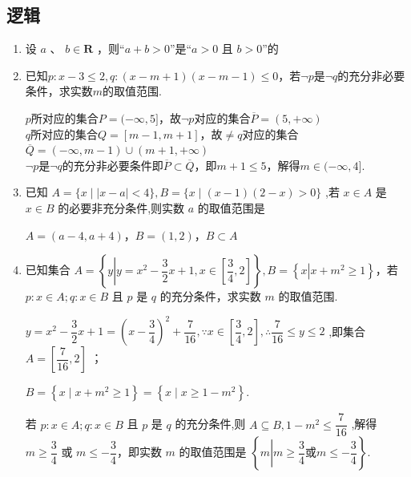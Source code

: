 \subsection*{逻辑}
\begin{enumerate}
    \item 设 $a$ 、 $b \in  \mathbf{R}$ ，则“$a + b > 0$”是“$a > 0$ 且 $b > 0$”的 
    \item 已知$p: x-3 \leq 2, q: (x-m+1)(x-m-1) \leq 0$，若$\neg p$是$\neg q$的充分非必要条件，求实数$m$的取值范围.
    \begin{jieda}
        $p$所对应的集合$P = (-\infty, 5]$，故$\neg p$对应的集合$\overline{P} = (5, +\infty)$ \\
        $q$所对应的集合$Q = [m-1, m+1]$，故$\neq q$对应的集合$\overline{Q} = (-\infty, m-1) \cup (m+1, +\infty)$ \\
        $\neg p$是$\neg q$的充分非必要条件即$\overline{P} \subset \overline{Q}$，即$m+1 \leq 5$，解得$m \in (-\infty, 4]$.
    \end{jieda}

    \item 已知 $A = \{ x \mid  \left| {x - a}\right|  < 4\} ,B = \{ x \mid  \left( {x - 1}\right) \left( {2 - x}\right)  > 0\}$ ,若 $x \in  A$ 是 $x \in  B$ 的必要非充分条件,则实数 $a$ 的取值范围是\blkda{$[-2, 5]$}
    \begin{jieda}
        $A = (a-4, a+4)$，$B = (1,2)$，$B \subset A$
    \end{jieda}
    
    \item 已知集合 $A = \left\{  {y\left| {y = {x}^{2} - \dfrac{3}{2}x + 1}\right. ,x \in  \left\lbrack  {\dfrac{3}{4},2}\right\rbrack  }\right\}  ,B = \left\{  {x\left| {x + {m}^{2} \geq  1}\right. }\right\}$，若 $p : x \in  A;q : x \in  B$ 且 $p$ 是 $q$ 的充分条件，求实数 $m$ 的取值范围.
    \begin{jieda}
        $y = {x}^{2} - \dfrac{3}{2}x + 1 = {\left( x - \dfrac{3}{4}\right) }^{2} + \dfrac{7}{16},\because x \in  \left\lbrack  {\dfrac{3}{4},2}\right\rbrack  ,\therefore \dfrac{7}{16} \leq  y \leq  2$ ,即集合 $A = \left\lbrack  {\dfrac{7}{16},2}\right\rbrack$ ；
        
        $B = \left\{  {x \mid  x + {m}^{2} \geq  1}\right\}   = \left\{  {x \mid  x \geq  1 - {m}^{2}}\right\}$.
            
        若 $p : x \in  A;q : x \in  B$ 且 $p$ 是 $q$ 的充分条件,则 $A \subseteq  B,1 - {m}^{2} \leq  \dfrac{7}{16}$ ,解得 $m \geq  \dfrac{3}{4}$ 或 $m \leq   - \dfrac{3}{4}$，即实数 $m$ 的取值范围是 $\left\{ m \left|  m \geq  \dfrac{3}{4} \text{或} m \leq   - \dfrac{3}{4} \right. \right\}$.
    \end{jieda}
    

\end{enumerate}
